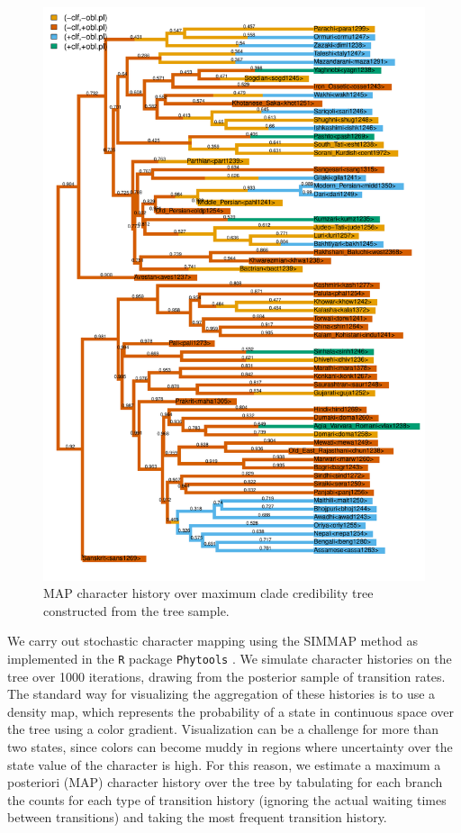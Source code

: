 \documentclass[11pt]{article}
\begin{document}
\begin{figure}[h!]
\centering
\includegraphics[width=.7\linewidth]{code/consensus_simmap.pdf}
\caption{MAP character history over maximum clade credibility tree constructed from the tree sample.}
\label{MAP}
\end{figure}

We carry out stochastic character mapping using the SIMMAP method \citep{Bollback2006} as implemented in the {\tt R} package {\tt Phytools} \citep{Revell2012}. We simulate character histories on the tree over 1000 iterations, drawing from the posterior sample of transition rates. 
The standard way for visualizing the aggregation of these histories is to use a density map, which represents the probability of a state in continuous space over the tree using a color gradient. Visualization can be a challenge for more than two states, since colors can become muddy in regions where uncertainty over the state value of the character is high. For this reason, we estimate a maximum a posteriori (MAP) character history over the tree by tabulating for each branch the counts for each type of transition history (ignoring the actual waiting times between transitions)
and taking the most frequent transition history. 
\end{document}
